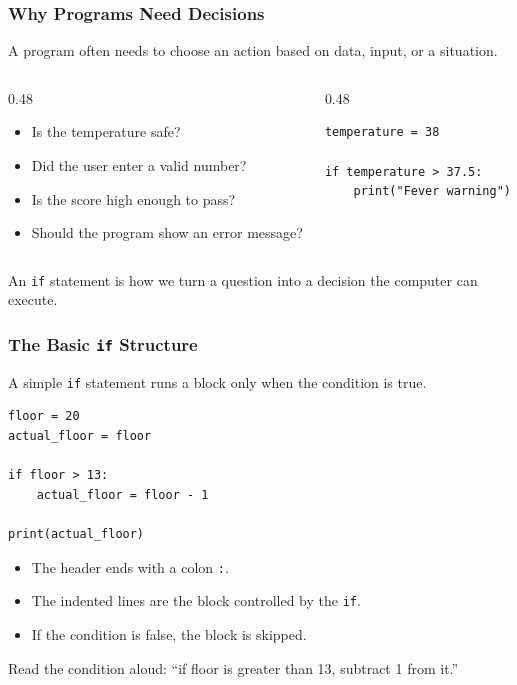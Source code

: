 \documentclass[aspectratio=169,10pt]{beamer}
\newcommand{\myitem}[1]{\item #1\vspace{0.04cm}}
\begin{document}
\begin{frame}[fragile]
\frametitle{Why Programs Need Decisions}
\begin{tcolorbox}[lecturebox,title=Key idea]
A program often needs to choose an action based on data, input, or a situation.
\end{tcolorbox}

\begin{columns}[T,totalwidth=\textwidth]
\begin{column}{0.48\textwidth}
\begin{itemize}\setlength\itemsep{0.04cm}
  \myitem{Is the temperature safe?}
  \myitem{Did the user enter a valid number?}
  \myitem{Is the score high enough to pass?}
  \myitem{Should the program show an error message?}
\end{itemize}
\end{column}
\begin{column}{0.48\textwidth}
\begin{lstlisting}[style=pycode]
temperature = 38

if temperature > 37.5:
    print("Fever warning")
\end{lstlisting}
\end{column}
\end{columns}

\begin{tcolorbox}[lecturebox,title=Programming lesson]
An \texttt{if} statement is how we turn a question into a decision the computer can execute.
\end{tcolorbox}
\end{frame}


\begin{frame}[fragile]
\frametitle{The Basic \texttt{if} Structure}
A simple \texttt{if} statement runs a block only when the condition is true.

\begin{lstlisting}[style=pycode]
floor = 20
actual_floor = floor

if floor > 13:
    actual_floor = floor - 1

print(actual_floor)
\end{lstlisting}

\begin{itemize}\setlength\itemsep{0.02cm}
  \myitem{The header ends with a colon \texttt{:}.}
  \myitem{The indented lines are the block controlled by the \texttt{if}.}
  \myitem{If the condition is false, the block is skipped.}
\end{itemize}

\begin{tcolorbox}[lecturebox,title=Beginner habit]
Read the condition aloud: ``if floor is greater than 13, subtract 1 from it.''
\end{tcolorbox}
\end{frame}
\end{document}

